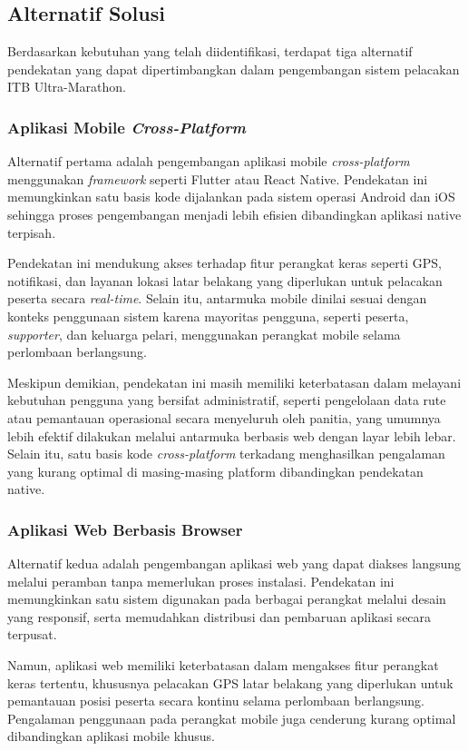 \subsection{Alternatif Solusi}
Berdasarkan kebutuhan yang telah diidentifikasi, terdapat tiga alternatif pendekatan yang dapat dipertimbangkan dalam pengembangan sistem pelacakan ITB Ultra-Marathon.

\subsubsection{Aplikasi Mobile \textit{Cross-Platform}}

Alternatif pertama adalah pengembangan aplikasi mobile \textit{cross-platform}
menggunakan \textit{framework} seperti Flutter atau React Native. Pendekatan
ini memungkinkan satu basis kode dijalankan pada sistem operasi Android dan
iOS sehingga proses pengembangan menjadi lebih efisien dibandingkan aplikasi
native terpisah.

Pendekatan ini mendukung akses terhadap fitur perangkat keras seperti GPS,
notifikasi, dan layanan lokasi latar belakang yang diperlukan untuk pelacakan
peserta secara \textit{real-time}. Selain itu, antarmuka mobile dinilai sesuai
dengan konteks penggunaan sistem karena mayoritas pengguna, seperti peserta,
\textit{supporter}, dan keluarga pelari, menggunakan perangkat mobile selama
perlombaan berlangsung.

Meskipun demikian, pendekatan ini masih memiliki keterbatasan dalam melayani
kebutuhan pengguna yang bersifat administratif, seperti pengelolaan data rute
atau pemantauan operasional secara menyeluruh oleh panitia, yang umumnya
lebih efektif dilakukan melalui antarmuka berbasis web dengan layar lebih
lebar. Selain itu, satu basis kode \textit{cross-platform} terkadang menghasilkan
pengalaman yang kurang optimal di masing-masing platform dibandingkan pendekatan
native.

\subsubsection{Aplikasi Web Berbasis Browser}

Alternatif kedua adalah pengembangan aplikasi web yang dapat diakses langsung
melalui peramban tanpa memerlukan proses instalasi. Pendekatan ini memungkinkan
satu sistem digunakan pada berbagai perangkat melalui desain yang responsif,
serta memudahkan distribusi dan pembaruan aplikasi secara terpusat.

Namun, aplikasi web memiliki keterbatasan dalam mengakses fitur perangkat keras
tertentu, khususnya pelacakan GPS latar belakang yang diperlukan untuk
pemantauan posisi peserta secara kontinu selama perlombaan berlangsung.
Pengalaman penggunaan pada perangkat mobile juga cenderung kurang optimal
dibandingkan aplikasi mobile khusus.


